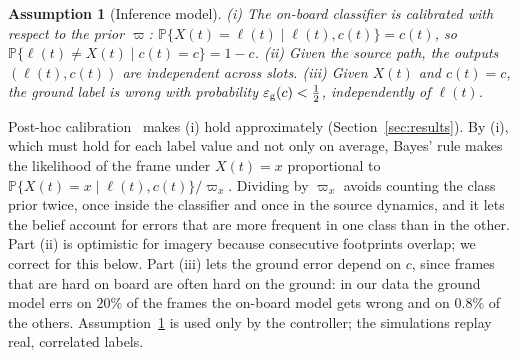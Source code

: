\documentclass[conference]{IEEEtran}
\newtheorem{assumption}{Assumption}
\theoremstyle{remark}
\newcommand{\Prob}{\mathbb{P}}
\newcommand{\lab}{\ell}
\newcommand{\ee}{\varepsilon}
\begin{document}
\begin{assumption}[Inference model]\label{as:inf}
(i) The on-board classifier is calibrated with respect to the prior $\varpi$: $\Prob\{X(t)=\lab(t)\mid\lab(t),c(t)\}=c(t)$, so $\Prob\{\lab(t)\neq X(t)\mid c(t)=c\}=1-c$. (ii) Given the source path, the outputs $(\lab(t),c(t))$ are independent across slots. (iii) Given $X(t)$ and $c(t)=c$, the ground label is wrong with probability $\ee_{\rm g}(c)<\tfrac12$, independently of $\lab(t)$.
\end{assumption}

Post-hoc calibration~\cite{guo2017calibration} makes (i) hold approximately (Section~\ref{sec:results}). By (i), which must hold for each label value and not only on average, Bayes' rule makes the likelihood of the frame under $X(t)=x$ proportional to $\Prob\{X(t)=x\mid\lab(t),c(t)\}/\varpi_x$. Dividing by $\varpi_x$ avoids counting the class prior twice, once inside the classifier and once in the source dynamics, and it lets the belief account for errors that are more frequent in one class than in the other. Part (ii) is optimistic for imagery because consecutive footprints overlap; we correct for this below. Part (iii) lets the ground error depend on $c$, since frames that are hard on board are often hard on the ground: in our data the ground model errs on $20\%$ of the frames the on-board model gets wrong and on $0.8\%$ of the others. Assumption~\ref{as:inf} is used only by the controller; the simulations replay real, correlated labels.
\end{document}
